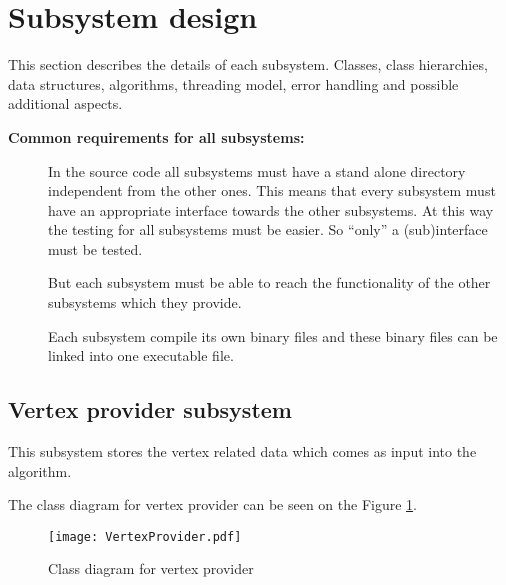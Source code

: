 


\section{Subsystem design}

This section describes the details of each subsystem. Classes, class
hierarchies, data structures, algorithms, threading model, error handling and
possible additional aspects.


\textbf{Common requirements for all subsystems:}

\begin{description}
	\item	[]	In the source code all subsystems
			must have a stand alone directory independent from the other ones.
			This means that every subsystem must have an appropriate interface
			towards the other subsystems. At this way the testing for all
			subsystems must be easier. So ``only'' a (sub)interface must be
			tested.
	
	\item	[] But each subsystem must be
			able to reach the functionality of the other subsystems which they
			provide.

	\item	[] Each subsystem compile its own binary
			files and these binary files can be linked into one executable file.
	
\end{description}



\subsection{Vertex provider subsystem}


This subsystem stores the vertex related data which comes as input into the
algorithm.

The class diagram for vertex provider can be seen on
the Figure \ref{fig:vertexprovider}.

\begin{figure}[h]
	\centering
	\texttt{[image: VertexProvider.pdf]}
	\caption{Class diagram for vertex provider}
	\label{fig:vertexprovider}
\end{figure}


